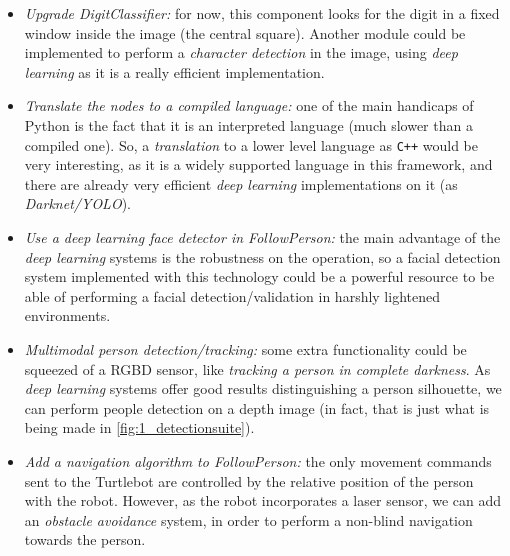 	\begin{itemize}
		\item \emph{Upgrade DigitClassifier:} for now, this component looks for the digit in a fixed window inside the image (the central square). Another module could be implemented to perform a \emph{character detection} in the image, using \emph{deep learning} as it is a really efficient implementation.
		
		\item \emph{Translate the nodes to a compiled language:} one of the main handicaps of Python is the fact that it is an interpreted language (much slower than a compiled one). So, a \emph{translation} to a lower level language as \texttt{C++} would be very interesting, as it is a widely supported language in this framework, and there are already very efficient \emph{deep learning} implementations on it (as \emph{Darknet/YOLO}).
		
		\item \emph{Use a deep learning face detector in FollowPerson:} the main advantage of the \emph{deep learning} systems is the robustness on the operation, so a facial detection system implemented with this technology could be a powerful resource to be able of performing a facial detection/validation in harshly lightened environments.
		
		\item \emph{Multimodal person detection/tracking:} some extra functionality could be squeezed of a RGBD sensor, like \emph{tracking a person in complete darkness}. As \emph{deep learning} systems offer good results distinguishing a person silhouette, we can perform people detection on a depth image (in fact, that is just what is being made in \autoref{fig:1_detectionsuite}).
		
		
		\item \emph{Add a navigation algorithm to FollowPerson:} the only movement commands sent to the Turtlebot are controlled by the relative position of the person with the robot. However, as the robot incorporates a laser sensor, we can add an \emph{obstacle avoidance} system, in order to perform a non-blind navigation towards the person.
	\end{itemize}
